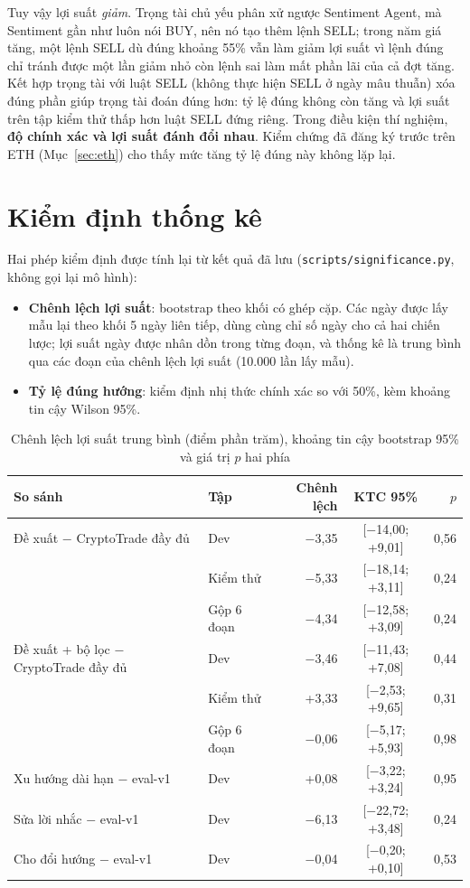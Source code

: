 Tuy vậy lợi suất \emph{giảm}. Trọng tài chủ yếu phân xử ngược Sentiment Agent, mà Sentiment gần như luôn nói BUY, nên
nó tạo thêm lệnh SELL; trong năm giá tăng, một lệnh SELL dù đúng khoảng 55\% vẫn làm giảm lợi suất vì lệnh đúng chỉ tránh
được một lần giảm nhỏ còn lệnh sai làm mất phần lãi của cả đợt tăng. Kết hợp trọng tài với luật SELL (không thực hiện
SELL ở ngày mâu thuẫn) xóa đúng phần giúp trọng tài đoán đúng hơn: tỷ lệ đúng không còn tăng và lợi suất trên tập kiểm
thử thấp hơn luật SELL đứng riêng. Trong điều kiện thí nghiệm, \textbf{độ chính xác và lợi suất đánh đổi nhau}.
Kiểm chứng đã đăng ký trước trên ETH (Mục~\ref{sec:eth}) cho thấy mức tăng tỷ lệ đúng này không lặp lại.

\section{Kiểm định thống kê}
\label{sec:significance}
Hai phép kiểm định được tính lại từ kết quả đã lưu (\texttt{scripts/significance.py}, không gọi lại mô hình):
\begin{itemize}
  \item \textbf{Chênh lệch lợi suất}: bootstrap theo khối có ghép cặp. Các ngày được lấy mẫu lại theo khối 5 ngày liên
  tiếp, dùng cùng chỉ số ngày cho cả hai chiến lược; lợi suất ngày được nhân dồn trong từng đoạn, và thống kê là trung
  bình qua các đoạn của chênh lệch lợi suất (10.000 lần lấy mẫu).
  \item \textbf{Tỷ lệ đúng hướng}: kiểm định nhị thức chính xác so với 50\%, kèm khoảng tin cậy Wilson 95\%.
\end{itemize}

\begin{table}[H]
\centering
\caption{Chênh lệch lợi suất trung bình (điểm phần trăm), khoảng tin cậy bootstrap 95\% và giá trị $p$ hai phía}
\label{tab:significance}
\small
\begin{tabular}{llrcr}
\toprule
So sánh & Tập & Chênh lệch & KTC 95\% & $p$ \\
\midrule
Đề xuất $-$ CryptoTrade đầy đủ & Dev & $-$3,35 & [$-$14,00; +9,01] & 0,56 \\
 & Kiểm thử & $-$5,33 & [$-$18,14; +3,11] & 0,24 \\
 & Gộp 6 đoạn & $-$4,34 & [$-$12,58; +3,09] & 0,24 \\
\midrule
Đề xuất + bộ lọc $-$ CryptoTrade đầy đủ & Dev & $-$3,46 & [$-$11,43; +7,08] & 0,44 \\
 & Kiểm thử & +3,33 & [$-$2,53; +9,65] & 0,31 \\
 & Gộp 6 đoạn & $-$0,06 & [$-$5,17; +5,93] & 0,98 \\
\midrule
Xu hướng dài hạn $-$ eval-v1 & Dev & +0,08 & [$-$3,22; +3,24] & 0,95 \\
Sửa lời nhắc $-$ eval-v1 & Dev & $-$6,13 & [$-$22,72; +3,48] & 0,24 \\
Cho đổi hướng $-$ eval-v1 & Dev & $-$0,04 & [$-$0,20; +0,10] & 0,53 \\
\bottomrule
\end{tabular}
\end{table}

